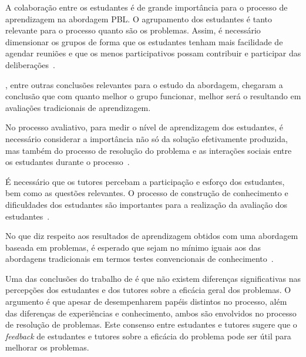 A colaboração entre os estudantes é de grande importância para o
processo de aprendizagem na abordagem \ac{PBL}.
O agrupamento dos estudantes é tanto relevante para o processo quanto
são os problemas. Assim, é necessário dimensionar os grupos de forma
que os estudantes tenham mais facilidade de agendar reuniões e que
os menos participativos possam contribuir e participar das
deliberações~\cite{savery2015overview, albanese2010problem}.

, entre outras conclusões
relevantes para o estudo da abordagem, chegaram a conclusão
que com quanto melhor o grupo funcionar, melhor será o
resultando em avaliações tradicionais de aprendizagem.

No processo avaliativo, para medir o nível de aprendizagem dos estudantes,
é necessário considerar a importância não só da solução
efetivamente produzida, mas também do
processo de resolução do problema e as interações sociais entre os estudantes durante
o processo~\cite{albanese2010problem}.

É necessário que os tutores percebam
a participação e esforço dos estudantes,
bem como as questões relevantes.
O processo de construção de conhecimento
e dificuldades dos estudantes são
importantes para a realização da avaliação
dos estudantes~\cite{dos2007aplicaccao}.

No que diz respeito aos resultados de aprendizagem
obtidos com uma abordagem baseada em problemas, é esperado que
sejam no mínimo iguais aos das abordagens tradicionais em
termos testes convencionais de conhecimento~\cite{savery2015overview}.


Uma das conclusões do trabalho de  é que
não existem diferenças significativas nas percepções dos estudantes
e dos tutores sobre a eficácia geral dos problemas.
O argumento é que apesar de desempenharem papéis distintos
no processo, além das diferenças de experiências e conhecimento,
ambos são envolvidos no processo de resolução de problemas.
Este consenso entre estudantes e tutores sugere que o \textit{feedback} de estudantes
e tutores sobre a eficácia do problema pode ser útil para melhorar
os problemas.
